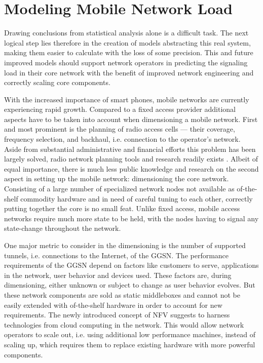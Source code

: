 \section{Modeling Mobile Network Load}
\label{c4:modeling}

Drawing conclusions from statistical analysis alone is a difficult task. The next logical step lies therefore in the creation of models abstracting this real system, making them easier to calculate with the loss of some precision. This and future improved models should support network operators in predicting the signaling load in their core network with the benefit of improved network engineering and correctly scaling core components.



With the increased importance of smart phones, mobile networks are currently experiencing rapid growth.
Compared to a fixed access provider additional aspects have to be taken into account when dimensioning a mobile network. 
First and most prominent is the planning of radio access cells --- their coverage, frequency selection,  and backhaul, i.e. connection to the operator's network. Aside from substantial administrative and financial efforts this problem has been largely solved, radio network planning tools and research readily exists \cite{tutschku1998demand}.
Albeit of equal importance, there is much less public knowledge and research on the second aspect in setting up the mobile network: dimensioning the core network. Consisting of a large number of specialized network nodes not available as of-the-shelf commodity hardware and in need of careful tuning to each other, correctly putting together the core is no small feat. Unlike fixed access, mobile access networks require much more state to be held, with the nodes having to signal any state-change throughout the network.

One major metric to consider in the dimensioning is the number of supported tunnels, i.e. connections to the Internet, of the \gls{GGSN}.
The performance requirements of the \gls{GGSN} depend on factors like customers to serve, applications in the network, user behavior and devices used. These factors are, during dimensioning, either unknown or subject to change as user behavior evolves.
But these network components are sold as static middleboxes and cannot not be easily extended with of-the-shelf hardware in order to account for new requirements.
The newly introduced concept of \gls{NFV} \cite{nfv_whitepaper} suggests to harness technologies from cloud computing in the network. This would allow network operators to scale out, i.e. using additional low performance machines, instead of scaling up, which requires them to replace existing hardware with more powerful components.


